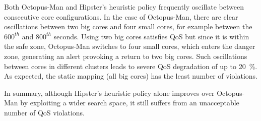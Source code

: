 Both Octopus-Man and Hipster's heuristic policy frequently oscillate between consecutive
core configurations.  In the case of Octopus-Man, there are clear oscillations between two
big cores and four small cores, for example between the $600^{th}$ and $800^{th}$ seconds.
Using two big cores satisfies QoS but since it is within the safe zone, Octopus-Man
switches to four small cores, which enters the danger zone, generating an alert provoking
a return to two big cores. Such oscillations between cores in different clusters leads to
severe QoS degradation of up to \SI{20}{\percent}. As expected, the static mapping (all
big cores) has the least number of violations. 

 In summary, although Hipster's heuristic policy alone improves over
Octopus-Man by exploiting a wider search space, it still suffers from an unacceptable
number of QoS violations.

